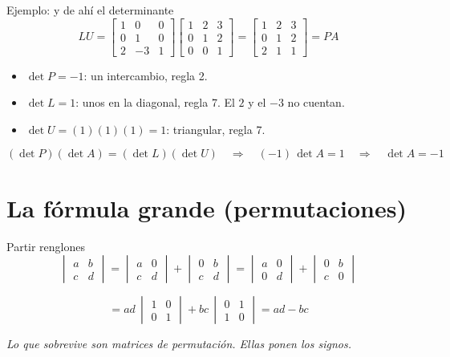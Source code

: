 \documentclass[aspectratio=169,11pt]{beamer}
\newcommand{\dt}[1]{\det #1}
\newcommand{\dbar}[1]{%
  \begin{vmatrix} #1 \end{vmatrix}%
}
\newcommand{\mat}[1]{%
  \begin{bmatrix} #1 \end{bmatrix}%
}
\newcommand{\remate}[1]{%
  \vspace{0.3em}
  \begin{center}\itshape\small #1\end{center}%
}
\begin{document}
\begin{frame}{Ejemplo: y de ahí el determinante}
  \[
    LU = \mat{1 & 0 & 0 \\ 0 & 1 & 0 \\ 2 & -3 & 1}
         \mat{1 & 2 & 3 \\ 0 & 1 & 2 \\ 0 & 0 & 1}
       = \mat{1 & 2 & 3 \\ 0 & 1 & 2 \\ 2 & 1 & 1}
       = PA
  \]

  \begin{itemize}
    \item $\dt{P} = -1$: un intercambio, regla 2.
    \item $\dt{L} = 1$: unos en la diagonal, regla 7. El $2$ y el
          $-3$ no cuentan.
    \item $\dt{U} = (1)(1)(1) = 1$: triangular, regla 7.
  \end{itemize}

  \[
    (\dt{P})(\dt{A}) = (\dt{L})(\dt{U})
    \quad\Longrightarrow\quad
    (-1)\,\dt{A} = 1
    \quad\Longrightarrow\quad
    \dt{A} = -1
  \]
\end{frame}


\section{La fórmula grande (permutaciones)}

\begin{frame}{Partir renglones}
  \[
    \dbar{a & b \\ c & d}
      = \dbar{a & 0 \\ c & d} + \dbar{0 & b \\ c & d}
      = \dbar{a & 0 \\ 0 & d} + \dbar{0 & b \\ c & 0}
  \]

  \[
    = ad\,\dbar{1 & 0 \\ 0 & 1} + bc\,\dbar{0 & 1 \\ 1 & 0}
      = ad - bc
  \]

  \remate{Lo que sobrevive son \alert{matrices de permutación}.
          Ellas ponen los signos.}
\end{frame}
\end{document}
